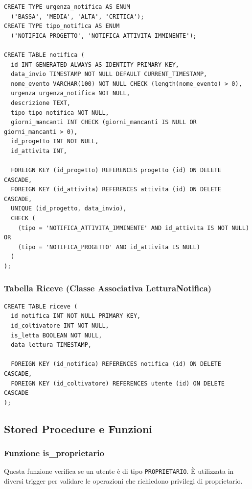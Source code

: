 \documentclass[12pt,a4paper]{article}
\begin{document}
\begin{lstlisting}[style=sqlstyle]
CREATE TYPE urgenza_notifica AS ENUM 
  ('BASSA', 'MEDIA', 'ALTA', 'CRITICA');
CREATE TYPE tipo_notifica AS ENUM 
  ('NOTIFICA_PROGETTO', 'NOTIFICA_ATTIVITA_IMMINENTE');

CREATE TABLE notifica (
  id INT GENERATED ALWAYS AS IDENTITY PRIMARY KEY,
  data_invio TIMESTAMP NOT NULL DEFAULT CURRENT_TIMESTAMP,
  nome_evento VARCHAR(100) NOT NULL CHECK (length(nome_evento) > 0),
  urgenza urgenza_notifica NOT NULL,
  descrizione TEXT,
  tipo tipo_notifica NOT NULL,
  giorni_mancanti INT CHECK (giorni_mancanti IS NULL OR giorni_mancanti > 0),
  id_progetto INT NOT NULL,
  id_attivita INT,
  
  FOREIGN KEY (id_progetto) REFERENCES progetto (id) ON DELETE CASCADE,
  FOREIGN KEY (id_attivita) REFERENCES attivita (id) ON DELETE CASCADE,
  UNIQUE (id_progetto, data_invio),
  CHECK (
    (tipo = 'NOTIFICA_ATTIVITA_IMMINENTE' AND id_attivita IS NOT NULL) OR
    (tipo = 'NOTIFICA_PROGETTO' AND id_attivita IS NULL)
  )
);
\end{lstlisting}

\subsubsection{Tabella Riceve (Classe Associativa LetturaNotifica)}

\begin{lstlisting}[style=sqlstyle]
CREATE TABLE riceve (
  id_notifica INT NOT NULL PRIMARY KEY,
  id_coltivatore INT NOT NULL,
  is_letta BOOLEAN NOT NULL,
  data_lettura TIMESTAMP,
  
  FOREIGN KEY (id_notifica) REFERENCES notifica (id) ON DELETE CASCADE,
  FOREIGN KEY (id_coltivatore) REFERENCES utente (id) ON DELETE CASCADE
);
\end{lstlisting}

\subsection{Stored Procedure e Funzioni}

\subsubsection{Funzione is\_proprietario}

Questa funzione verifica se un utente è di tipo \texttt{PROPRIETARIO}. È utilizzata in diversi trigger per validare le operazioni che richiedono privilegi di proprietario.
\end{document}
